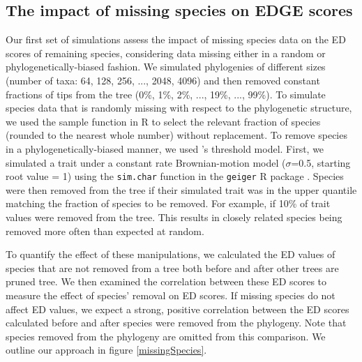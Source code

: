\documentclass[12pt,english]{article}
\begin{document}
\subsection*{The impact of missing species on EDGE scores}
Our first set of simulations assess the impact of missing species data on the ED
scores of remaining species, considering data missing either in a random or
phylogenetically-biased fashion. We simulated phylogenies of different sizes
(number of taxa: 64, 128, 256, ..., 2048, 4096) and then removed constant
fractions of tips from the tree (0\%, 1\%, 2\%, ..., 19\%, ..., 99\%). To
simulate species data that is randomly missing with respect to the phylogenetic
structure, we used the sample function in R to select the relevant fraction of
species (rounded to the nearest whole number) without replacement. To remove
species in a phylogenetically-biased manner, we used
\textcite{Felsenstein2005}'s threshold model. First, we simulated a trait under
a constant rate Brownian-motion model ($\sigma$=0.5, starting root value = 1)
using the \texttt{sim.char} function in the \texttt{geiger} R package
\autocite{Pennell2014}. Species were then removed from the tree if their
simulated trait was in the upper quantile matching the fraction of species to be
removed. For example, if 10\% of trait values were removed from the tree. This
results in closely related species being removed more often than expected at
random.

To quantify the effect of these manipulations, we calculated the ED values of
species that are not removed from a tree both before and after other trees are
pruned tree. We then examined the correlation between these ED scores to measure
the effect of species’ removal on ED scores. If missing species do not affect ED
values, we expect a strong, positive correlation between the ED scores
calculated before and after species were removed from the phylogeny. Note that
species removed from the phylogeny are omitted from this comparison. We outline
our approach in figure \ref{missingSpecies}.
\end{document}

